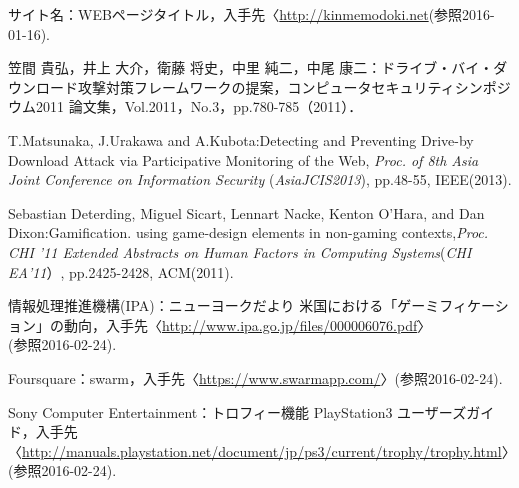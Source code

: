 \begin{thebibliography}{99}

サイト名：WEBページタイトル，入手先〈\url{http://kinmemodoki.net}(参照2016-01-16).

 笠間 貴弘，井上 大介，衛藤 将史，中里 純二，中尾 康二：ドライブ・バイ・ダウンロード攻撃対策フレームワークの提案，コンピュータセキュリティシンポジウム2011 論文集，Vol.2011，No.3，pp.780-785（2011）．

T.Matsunaka, J.Urakawa and A.Kubota:Detecting and Preventing Drive-by Download Attack via Participative Monitoring of the Web, {\it Proc. of 8th Asia Joint Conference on Information Security} ({\it AsiaJCIS2013}), pp.48-55, IEEE(2013).

Sebastian Deterding, Miguel Sicart, Lennart Nacke, Kenton O’Hara, and Dan Dixon:Gamification. using game-design elements in non-gaming contexts,{\it Proc. CHI ’11 Extended Abstracts on Human Factors in Computing Systems}({\it CHI EA’11}）, pp.2425-2428, ACM(2011).

情報処理推進機構(IPA)：ニューヨークだより 米国における「ゲーミフィケーション」の動向，入手先〈\url{http://www.ipa.go.jp/files/000006076.pdf}〉\\(参照2016-02-24).

Foursquare：swarm，入手先〈\url{https://www.swarmapp.com/}〉(参照2016-02-24).

Sony Computer Entertainment：トロフィー機能 PlayStation3 ユーザーズガイド，入手先〈\url{http://manuals.playstation.net/document/jp/ps3/current/trophy/trophy.html}〉(参照2016-02-24).

\end{thebibliography}

